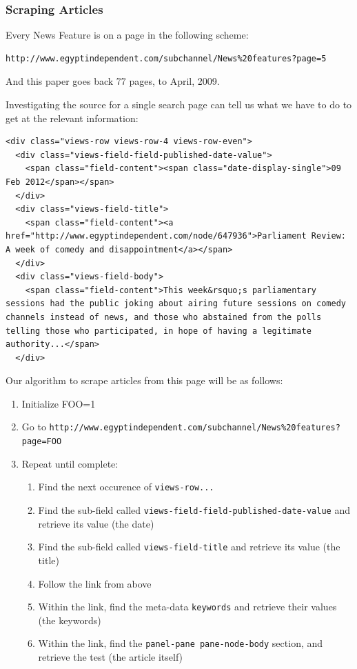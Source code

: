 \documentclass[11pt]{article}
\begin{document}
\subsubsection{Scraping Articles}
\label{sec-4-1-3}


Every News Feature is on a page in the following scheme:


\begin{verbatim}
http://www.egyptindependent.com/subchannel/News%20features?page=5
\end{verbatim}

And this paper goes back 77 pages, to April, 2009.

Investigating the source for a single search page can tell us what we
have to do to get at the relevant information:


\begin{verbatim}
<div class="views-row views-row-4 views-row-even">
  <div class="views-field-field-published-date-value">
    <span class="field-content"><span class="date-display-single">09 Feb 2012</span></span>
  </div>
  <div class="views-field-title">
    <span class="field-content"><a href="http://www.egyptindependent.com/node/647936">Parliament Review: A week of comedy and disappointment</a></span>
  </div> 
  <div class="views-field-body">
    <span class="field-content">This week&rsquo;s parliamentary sessions had the public joking about airing future sessions on comedy channels instead of news, and those who abstained from the polls telling those who participated, in hope of having a legitimate authority...</span>
  </div>
\end{verbatim}

Our algorithm to scrape articles from this page will be as follows:
\begin{enumerate}
\item Initialize FOO=1
\item Go to
   \texttt{http://www.egyptindependent.com/subchannel/News\%20features?page=FOO}
\item Repeat until complete:
\begin{enumerate}
\item Find the next occurence of \texttt{views-row...}
\item Find the sub-field called
      \texttt{views-field-field-published-date-value} and retrieve its value
      (the date)
\item Find the sub-field called \texttt{views-field-title} and retrieve its
      value (the title)
\item Follow the link from above
\item Within the link, find the meta-data \texttt{keywords} and retrieve
      their values (the keywords)
\item Within the link, find the \texttt{panel-pane pane-node-body} section,
      and retrieve the test (the article itself)
\end{enumerate}
\end{enumerate}
\end{document}
